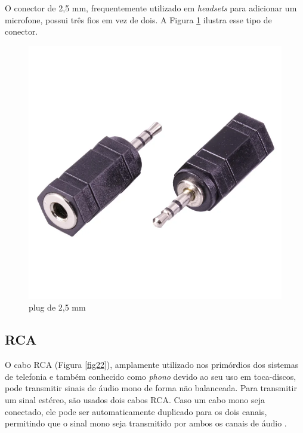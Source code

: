 O conector de 2,5 mm, frequentemente utilizado em \textit{headsets} para adicionar um microfone, possui três fios em vez de dois. A Figura \ref{fig21} ilustra esse tipo de conector.

\begin{figure}[h]
	\centering
    \includegraphics[scale=0.2]{figuras/fig21.png}
	\caption{plug de 2,5 mm \cite{mouser}}
	\label{fig21}
\end{figure}

\subsection{RCA}

O cabo RCA (Figura \ref{fig22}), amplamente utilizado nos primórdios dos sistemas de telefonia e também conhecido como \textit{phono} devido ao seu uso em toca-discos, pode transmitir sinais de áudio mono de forma não balanceada. Para transmitir um sinal estéreo, são usados dois cabos RCA. Caso um cabo mono seja conectado, ele pode ser automaticamente duplicado para os dois canais, permitindo que o sinal mono seja transmitido por ambos os canais de áudio \cite{bartlett}.

